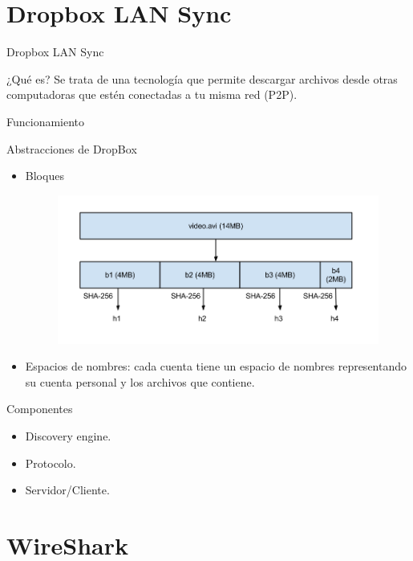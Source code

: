 \documentclass[10pt]{beamer}
\begin{document}
\section{Dropbox LAN Sync}

\begin{frame}{Dropbox LAN Sync}
\begin{alertblock}{¿Qué es?}
	Se trata de una tecnología que  permite descargar archivos desde otras computadoras que estén conectadas a tu misma red (P2P).
\end{alertblock}
\end{frame}

\begin{frame}{Funcionamiento}
\begin{alertblock}{Abstracciones de DropBox}
	\begin{itemize}
		\item Bloques
		\begin{figure}[h]
			\centering
			\includegraphics[width=0.7\linewidth]{bloques}

		\end{figure}
		
		\item Espacios de nombres: cada cuenta tiene un espacio de nombres representando su cuenta personal y los archivos que contiene.
	\end{itemize}
	
\end{alertblock}
\end{frame}

\begin{frame}{Componentes}
\begin{itemize}
	\item Discovery engine.
	\item Protocolo.
	\item Servidor/Cliente.
\end{itemize}
\end{frame}

\section{WireShark}
\end{document}
